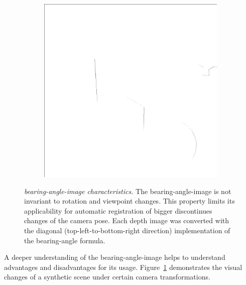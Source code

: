 \begin{figure}[b!]
\begin{subfigure}[t]{0.32\textwidth}
    \end{subfigure}
    \begin{subfigure}[t]{0.32\textwidth}
        \includegraphics[width=\linewidth]{chapter04/img/bearing-diag-0210.png}
    \end{subfigure}
    \caption[\gls{bearing-angle-image} characteristics]{\emph{\gls{bearing-angle-image} characteristics.} The \gls{bearing-angle-image} is not invariant to rotation and viewpoint changes. This property limits its applicability for automatic registration of bigger discontinues changes of the camera pose. Each depth image was converted with the diagonal (top-left-to-bottom-right direction) implementation of the \gls{bearing-angle} formula.}\label{fig:bearing_characteristics}
\end{figure}
A deeper understanding of the \gls{bearing-angle-image} helps to understand advantages and disadvantages for its usage.
Figure~\ref{fig:bearing_characteristics} demonstrates the visual changes of a synthetic scene under certain camera transformations.

